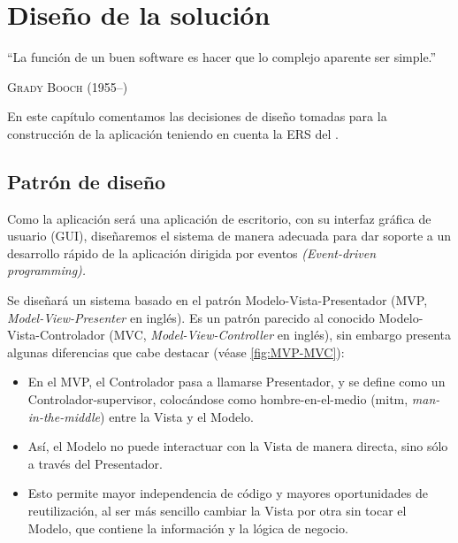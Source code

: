 
\chapter{Diseño de la solución}

\epigraph{``La función de un buen software es hacer que lo complejo aparente ser simple.''}{\textsc{Grady Booch} (1955--)}

En este capítulo comentamos las decisiones de diseño tomadas para la construcción de la aplicación teniendo en cuenta la ERS del .

\section{Patrón de diseño}

Como la aplicación será una aplicación de escritorio, con su interfaz gráfica de usuario (GUI), diseñaremos el sistema de manera adecuada para dar soporte a un desarrollo rápido de la aplicación dirigida por eventos \emph{(Event-driven programming).}

Se diseñará un sistema basado en el patrón Modelo-Vista-Presentador (MVP, \emph{Model-View-Presenter} en inglés). Es un patrón parecido al conocido Modelo-Vista-Controlador (MVC, \emph{Model-View-Controller} en inglés), sin embargo presenta algunas diferencias que cabe destacar (véase \autoref{fig:MVP-MVC}):

\begin{itemize}
\item En el MVP, el Controlador pasa a llamarse Presentador, y se define como un Controlador-supervisor, colocándose como hombre-en-el-medio (mitm, \emph{man-in-the-middle}) entre la Vista y el Modelo.
\item Así, el Modelo no puede interactuar con la Vista de manera directa, sino sólo a través del Presentador.
\item Esto permite mayor independencia de código y mayores oportunidades de reutilización, al ser más sencillo cambiar la Vista por otra sin tocar el Modelo, que contiene la información y la lógica de negocio.
\end{itemize}

